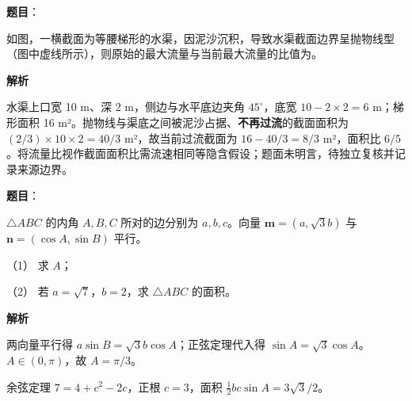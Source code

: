 \begin{answer}

\textbf{题目}：

如图，一横截面为等腰梯形的水渠，因泥沙沉积，导致水渠截面边界呈抛物线型（图中虚线所示），则原始的最大流量与当前最大流量的比值为\gkblank{}。
\nopagebreak[4]
\begin{center}\end{center}
\nopagebreak[4]
\textbf{解析}

水渠上口宽 10 m、深 2 m，侧边与水平底边夹角 $45^\circ$，底宽 $10-2\times2=6$ m；梯形面积 16 m²。抛物线与渠底之间被泥沙占据、\textbf{不再过流}的截面面积为 $(2/3)\times10\times2=40/3$ m²，故当前过流截面为 $16-40/3=8/3$ m²，面积比 $6/5$。将流量比视作截面面积比需流速相同等隐含假设；题面未明言，待独立复核并记录来源边界。


\end{answer}
\begin{answer}

\textbf{题目}：

$\triangle ABC$ 的内角 $A,B,C$ 所对的边分别为 $a,b,c$。向量 $\boldsymbol m=(a,\sqrt3b)$ 与 $\boldsymbol n=(\cos A,\sin B)$ 平行。

（1） 求 $A$；

（2） 若 $a=\sqrt7$，$b=2$，求 $\triangle ABC$ 的面积。

\textbf{解析}


两向量平行得 $a\sin B=\sqrt3b\cos A$；正弦定理代入得 $\sin A=\sqrt3\cos A$。$A\in(0,\pi)$，故 $A=\pi/3$。


余弦定理 $7=4+c^2-2c$，正根 $c=3$，面积 $\frac12bc\sin A=3\sqrt3/2$。



\end{answer}
